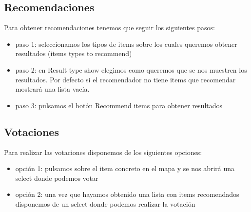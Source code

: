 \subsection{Recomendaciones}

Para obtener recomendaciones tenemos que seguir los siguientes pasos:

\begin{itemize}
	\item paso 1: seleccionamos los tipos de items sobre los cuales queremos obtener resultados (items types to recommend)
	\item paso 2: en Result type show elegimos como queremos que se nos muestren los resultados. Por defecto si el recomendador no tiene items que recomendar mostrará una lista vacía.
	\item paso 3: pulsamos el botón Recommend items para obtener resultados
\end{itemize}

\subsection{Votaciones}

Para realizar las votaciones disponemos de los siguientes opciones:

\begin{itemize}
	\item opción 1: pulsamos sobre el item concreto en el mapa y se nos abrirá una select donde podemos votar
	\item opción 2: una vez que hayamos obtenido una lista con items recomendados disponemos de un select donde podemos realizar la votación
\end{itemize}


